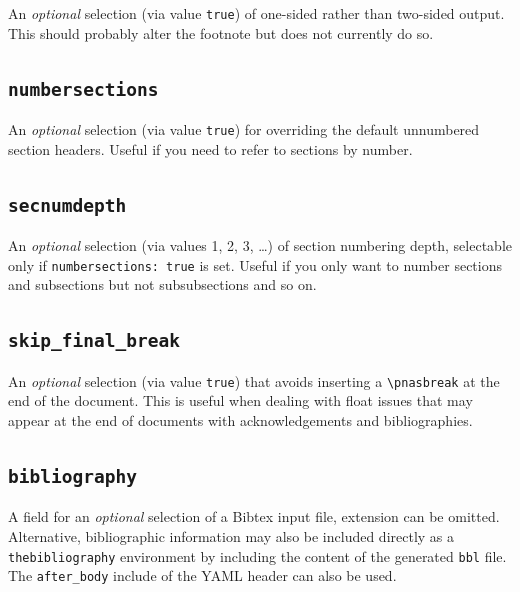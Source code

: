 \documentclass[letterpaper,9pt,twocolumn,twoside,]{pinp}
\begin{document}
An \emph{optional} selection (via value \texttt{true}) of one-sided
rather than two-sided output. This should probably alter the footnote
but does not currently do so.

\hypertarget{numbersections}{%
\subsection{\texorpdfstring{\texttt{numbersections}}{numbersections}}\label{numbersections}}

An \emph{optional} selection (via value \texttt{true}) for overriding
the default unnumbered section headers. Useful if you need to refer to
sections by number.

\hypertarget{secnumdepth}{%
\subsection{\texorpdfstring{\texttt{secnumdepth}}{secnumdepth}}\label{secnumdepth}}

An \emph{optional} selection (via values 1, 2, 3, \ldots) of section
numbering depth, selectable only if \texttt{numbersections:\ true} is
set. Useful if you only want to number sections and subsections but not
subsubsections and so on.

\hypertarget{skip_final_break}{%
\subsection{\texorpdfstring{\texttt{skip\_final\_break}}{skip\_final\_break}}\label{skip_final_break}}

An \emph{optional} selection (via value \texttt{true}) that avoids
inserting a \texttt{\textbackslash{}pnasbreak} at the end of the
document. This is useful when dealing with float issues that may appear
at the end of documents with acknowledgements and bibliographies.

\hypertarget{bibliography}{%
\subsection{\texorpdfstring{\texttt{bibliography}}{bibliography}}\label{bibliography}}

A field for an \emph{optional} selection of a Bibtex input file,
extension can be omitted. Alternative, bibliographic information may
also be included directly as a \texttt{thebibliography} environment by
including the content of the generated \texttt{bbl} file. The
\texttt{after\_body} include of the YAML header can also be used.
\end{document}
